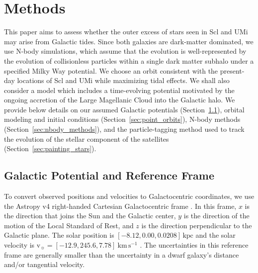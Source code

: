 \documentclass[times,trackchanges, twocolumn, twocolappendix]{aastex701}
\newcommand{\V}{\textrm{v}}
\newcommand{\kpc}{\text{kpc}}
\newcommand{\kms}{\mathrm{km\,s^{-1}}}
\begin{document}
\section{Methods} \label{sec:methods}

This paper aims to assess whether the outer excess of stars seen in Scl and UMi may arise from Galactic tides. Since both galaxies are dark-matter dominated, we use N-body simulations, which assume that the evolution is well-represented by the evolution of collisionless particles within a single dark matter subhalo under a specified Milky Way potential. We choose an orbit consistent with the present-day locations of Scl and UMi while maximizing tidal effects. We shall also consider a model which includes a time-evolving potential motivated by the ongoing accretion of the Large Magellanic Cloud into the Galactic halo.  We provide below details on our assumed Galactic potentials (Section~\ref{milky-way-potential}), orbital modeling and initial conditions (Section~\ref{sec:point_orbits}), N-body methods (Section~\ref{sec:nbody_methods}), and the particle-tagging method used to track the evolution of the stellar component of the satellites (Section~\ref{sec:painting_stars}).

\subsection{Galactic Potential and Reference Frame}\label{milky-way-potential}


To convert observed positions and velocities to Galactocentric
coordinates, we use the Astropy v4 right-handed Cartesian Galactocentric frame
\citep{astropycollaboration+2022}. In this frame, $x$ is the direction that joins the Sun and the Galactic center, $y$ is the direction of the motion of the Local
Standard of Rest, and $z$ is the direction perpendicular to the
Galactic plane. The solar position is
$[-8.12, 0.00, 0.0208]\, \kpc$
\citep{gravitycollaboration+2018, bennett+bovy2019} and the solar
velocity is $\V_\sun = [-12.9, 245.6, 7.78]\ \kms$
\citep{reid+brunthaler2004, drimmel+poggio2018, gravitycollaboration+2018}.
The uncertainties in this reference frame are generally smaller than the
uncertainty in a dwarf galaxy's distance and/or tangential velocity.
\end{document}
